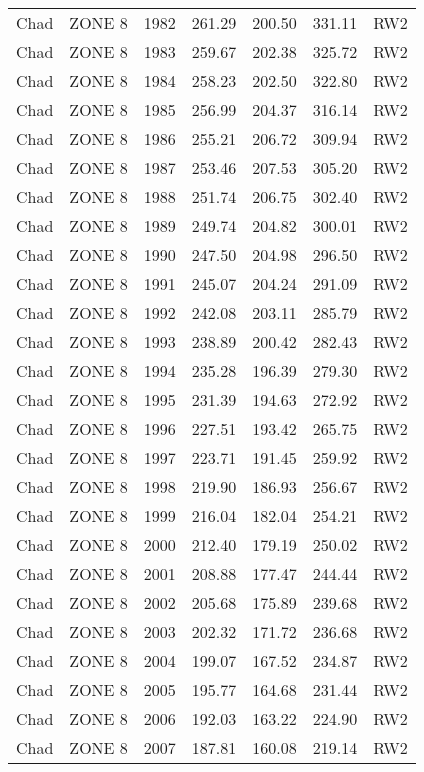 \begin{longtable}{lllrrrl}
  Chad & ZONE 8 & 1982 & 261.29 & 200.50 & 331.11 & RW2 \\ 
  Chad & ZONE 8 & 1983 & 259.67 & 202.38 & 325.72 & RW2 \\ 
  Chad & ZONE 8 & 1984 & 258.23 & 202.50 & 322.80 & RW2 \\ 
  Chad & ZONE 8 & 1985 & 256.99 & 204.37 & 316.14 & RW2 \\ 
  Chad & ZONE 8 & 1986 & 255.21 & 206.72 & 309.94 & RW2 \\ 
  Chad & ZONE 8 & 1987 & 253.46 & 207.53 & 305.20 & RW2 \\ 
  Chad & ZONE 8 & 1988 & 251.74 & 206.75 & 302.40 & RW2 \\ 
  Chad & ZONE 8 & 1989 & 249.74 & 204.82 & 300.01 & RW2 \\ 
  Chad & ZONE 8 & 1990 & 247.50 & 204.98 & 296.50 & RW2 \\ 
  Chad & ZONE 8 & 1991 & 245.07 & 204.24 & 291.09 & RW2 \\ 
  Chad & ZONE 8 & 1992 & 242.08 & 203.11 & 285.79 & RW2 \\ 
  Chad & ZONE 8 & 1993 & 238.89 & 200.42 & 282.43 & RW2 \\ 
  Chad & ZONE 8 & 1994 & 235.28 & 196.39 & 279.30 & RW2 \\ 
  Chad & ZONE 8 & 1995 & 231.39 & 194.63 & 272.92 & RW2 \\ 
  Chad & ZONE 8 & 1996 & 227.51 & 193.42 & 265.75 & RW2 \\ 
  Chad & ZONE 8 & 1997 & 223.71 & 191.45 & 259.92 & RW2 \\ 
  Chad & ZONE 8 & 1998 & 219.90 & 186.93 & 256.67 & RW2 \\ 
  Chad & ZONE 8 & 1999 & 216.04 & 182.04 & 254.21 & RW2 \\ 
  Chad & ZONE 8 & 2000 & 212.40 & 179.19 & 250.02 & RW2 \\ 
  Chad & ZONE 8 & 2001 & 208.88 & 177.47 & 244.44 & RW2 \\ 
  Chad & ZONE 8 & 2002 & 205.68 & 175.89 & 239.68 & RW2 \\ 
  Chad & ZONE 8 & 2003 & 202.32 & 171.72 & 236.68 & RW2 \\ 
  Chad & ZONE 8 & 2004 & 199.07 & 167.52 & 234.87 & RW2 \\ 
  Chad & ZONE 8 & 2005 & 195.77 & 164.68 & 231.44 & RW2 \\ 
  Chad & ZONE 8 & 2006 & 192.03 & 163.22 & 224.90 & RW2 \\ 
  Chad & ZONE 8 & 2007 & 187.81 & 160.08 & 219.14 & RW2 \\ 

\end{longtable}
